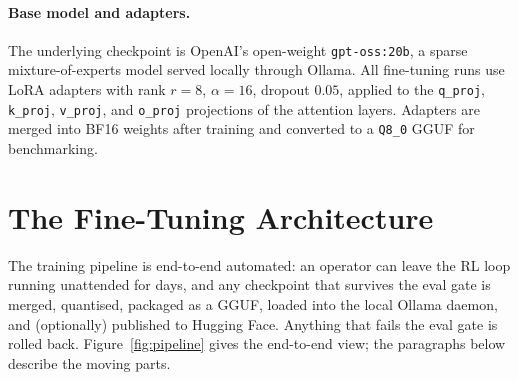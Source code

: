 \documentclass[11pt]{article}
\begin{document}
\paragraph{Base model and adapters.} The underlying checkpoint is
OpenAI's open-weight \texttt{gpt-oss:20b}, a sparse mixture-of-experts
model served locally through Ollama. All fine-tuning runs use LoRA
adapters with rank $r=8$, $\alpha=16$, dropout $0.05$, applied to the
\texttt{q\_proj}, \texttt{k\_proj}, \texttt{v\_proj}, and \texttt{o\_proj}
projections of the attention layers. Adapters are merged into BF16
weights after training and converted to a \texttt{Q8\_0} GGUF for
benchmarking.

\section{The Fine-Tuning Architecture}
\label{sec:arch}

The training pipeline is end-to-end automated: an operator can leave the
RL loop running unattended for days, and any checkpoint that survives the
eval gate is merged, quantised, packaged as a GGUF, loaded into the local
Ollama daemon, and (optionally) published to Hugging Face. Anything that
fails the eval gate is rolled back. Figure~\ref{fig:pipeline} gives the
end-to-end view; the paragraphs below describe the moving parts.
\end{document}
